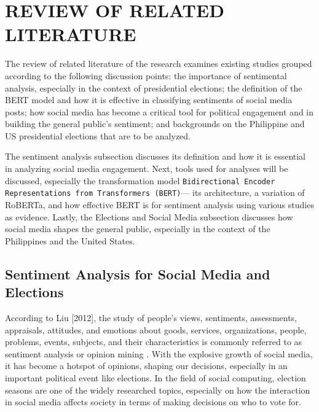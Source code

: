 \chapter{REVIEW OF RELATED LITERATURE}
The review of related literature of the research examines existing studies grouped according to the following discussion points: the importance of sentimental analysis, especially in the context of presidential elections; the definition of the BERT model and how it is effective in classifying sentiments of social media posts; how social media has become a critical tool for political engagement and in building the general public’s sentiment; and backgrounds on the Philippine and US presidential elections that are to be analyzed.

The sentiment analysis subsection discusses its definition and how it is essential in analyzing social media engagement. Next, tools used for analyses will be discussed, especially the transformation model \texttt{Bidirectional Encoder Representations from Transformers (BERT)}— its architecture, a variation of\\RoBERTa, and how effective BERT is for sentiment analysis using various studies as evidence. Lastly, the Elections and Social Media subsection discusses how social media shapes the general public, especially in the context of the Philippines and the United States.

\section{Sentiment Analysis for Social Media and Elections}
According to Liu [2012], the study of people's views, sentiments, assessments, appraisals, attitudes, and emotions about goods, services, organizations, people, problems, events, subjects, and their characteristics is commonly referred to as sentiment analysis or opinion mining \cite{RRL_Liu-2012}. With the explosive growth of social media, it has become a hotspot of opinions, shaping our decisions, especially in an important political event like elections. In the field of social computing, election seasons are one of the widely researched topics, especially on how the interaction in social media affects society in terms of making decisions on who to vote for. 

